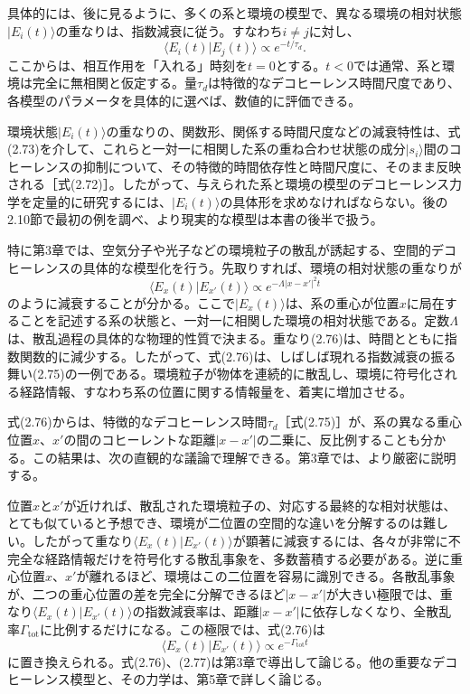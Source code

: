 \hypertarget{srcpage:70}{}\label{srcpage:70}
具体的には、後に見るように、多くの系と環境の模型で、異なる環境の相対状態$\lvert E_i(t)\rangle$の重なりは、指数減衰に従う。すなわち$i\ne j$に対し、
\begin{equation}\langle E_i(t)\vert E_j(t)\rangle\propto e^{-t/\tau_d}.\tag{2.75}\end{equation}
ここからは、相互作用を「入れる」時刻を$t=0$とする。$t<0$では通常、系と環境は完全に無相関と仮定する。量$\tau_d$は特徴的なデコヒーレンス時間尺度であり、各模型のパラメータを具体的に選べば、数値的に評価できる。

環境状態$\lvert E_i(t)\rangle$の重なりの、関数形、関係する時間尺度などの減衰特性は、式(2.73)を介して、これらと一対一に相関した系の重ね合わせ状態の成分$\lvert s_i\rangle$間のコヒーレンスの抑制について、その特徴的時間依存性と時間尺度に、そのまま反映される［式(2.72)］。したがって、与えられた系と環境の模型のデコヒーレンス力学を定量的に研究するには、$\lvert E_i(t)\rangle$の具体形を求めなければならない。後の2.10節で最初の例を調べ、より現実的な模型は本書の後半で扱う。

特に第3章では、空気分子や光子などの環境粒子の散乱が誘起する、空間的デコヒーレンスの具体的な模型化を行う。先取りすれば、環境の相対状態の重なりが
\begin{equation}\langle E_x(t)\vert E_{x'}(t)\rangle\propto e^{-\Lambda\lvert x-x'\rvert^2t}\tag{2.76}\end{equation}
のように減衰することが分かる。ここで$\lvert E_x(t)\rangle$は、系の重心が位置$x$に局在することを記述する系の状態と、一対一に相関した環境の相対状態である。定数$\Lambda$は、散乱過程の具体的な物理的性質で決まる。重なり(2.76)は、時間とともに指数関数的に減少する。したがって、式(2.76)は、しばしば現れる指数減衰の振る舞い(2.75)の一例である。環境粒子が物体を連続的に散乱し、環境に符号化される経路情報、すなわち系の位置に関する情報量を、着実に増加させる。

式(2.76)からは、特徴的なデコヒーレンス時間$\tau_d$［式(2.75)］が、系の異なる重心位置$x$、$x'$の間のコヒーレントな距離$\lvert x-x'\rvert$の二乗に、反比例することも分かる。この結果は、次の直観的な議論で理解できる。第3章では、より厳密に説明する。

\hypertarget{srcpage:71}{}\label{srcpage:71}
位置$x$と$x'$が近ければ、散乱された環境粒子の、対応する最終的な相対状態は、とても似ていると予想でき、環境が二位置の空間的な違いを分解するのは難しい。したがって重なり$\langle E_x(t)\vert E_{x'}(t)\rangle$が顕著に減衰するには、各々が非常に不完全な経路情報だけを符号化する散乱事象を、多数蓄積する必要がある。逆に重心位置$x$、$x'$が離れるほど、環境はこの二位置を容易に識別できる。各散乱事象が、二つの重心位置の差を完全に分解できるほど$\lvert x-x'\rvert$が大きい極限では、重なり$\langle E_x(t)\vert E_{x'}(t)\rangle$の指数減衰率は、距離$\lvert x-x'\rvert$に依存しなくなり、全散乱率$\Gamma_{\mathrm{tot}}$に比例するだけになる。この極限では、式(2.76)は
\begin{equation}\langle E_x(t)\vert E_{x'}(t)\rangle\propto e^{-\Gamma_{\mathrm{tot}}t}\tag{2.77}\end{equation}
に置き換えられる。式(2.76)、(2.77)は第3章で導出して論じる。他の重要なデコヒーレンス模型と、その力学は、第5章で詳しく論じる。
